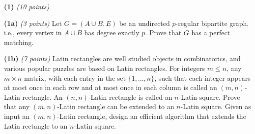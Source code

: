 \documentclass[12pt]{article}
\def\bigap{0.25in}
\begin{document}
\setlength{\parindent}{0in}
\addtolength{\parskip}{0.1cm}
\setlength{\fboxrule}{.5mm}\setlength{\fboxsep}{1.2mm}
\newlength{\boxlength}\setlength{\boxlength}{\textwidth}
\addtolength{\boxlength}{-4mm}
\begin{center}
\end{center}
\vspace{5mm}
\vskip \bigap
{\bf (1)} {\em (10 points)}



{\bf (1a)} {\em (3 points)} Let $G= (A \cup B, E)$ be an undirected $p$-regular bipartite graph, i.e., every vertex in $A \cup B$ has degree exactly $p$. Prove that $G$ has a perfect matching.

\vskip \bigap

{\bf (1b)} {\em (7 points)} Latin rectangles are well studied objects in combinatorics, and various popular puzzles are  based on Latin rectangles. For integers $m\le n$, any  $m \times n$ matrix, with each entry in the set $\{1,\ldots,n\}$, such that each integer appears at most once in each row and at most once in each column is called an $(m,n)$-Latin rectangle. An $(n,n)$-Latin rectangle is called an $n$-Latin square. Prove that any $(m,n)$-Latin rectangle can be extended to an $n$-Latin square. Given as input an $(m ,n)$-Latin rectangle, design an efficient algorithm that  extends the Latin rectangle to an $n$-Latin square.
\end{document}
